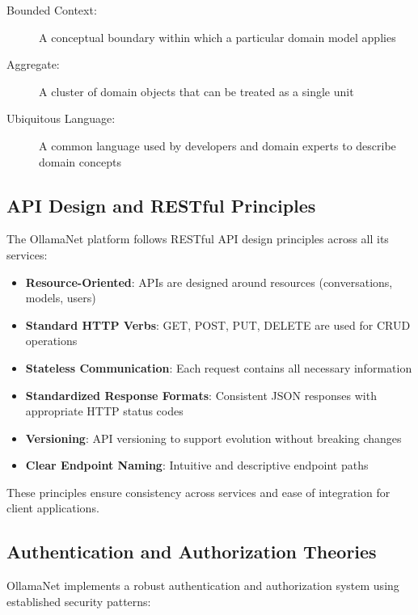 \begin{terminology}
\begin{description}
    \item[Bounded Context:] A conceptual boundary within which a particular domain model applies
    \item[Aggregate:] A cluster of domain objects that can be treated as a single unit
    \item[Ubiquitous Language:] A common language used by developers and domain experts to describe domain concepts
\end{description}
\end{terminology}

\subsection{API Design and RESTful Principles}

The OllamaNet platform follows RESTful API design principles across all its services:

\begin{itemize}
    \item \textbf{Resource-Oriented}: APIs are designed around resources (conversations, models, users)
    \item \textbf{Standard HTTP Verbs}: GET, POST, PUT, DELETE are used for CRUD operations
    \item \textbf{Stateless Communication}: Each request contains all necessary information
    \item \textbf{Standardized Response Formats}: Consistent JSON responses with appropriate HTTP status codes
    \item \textbf{Versioning}: API versioning to support evolution without breaking changes
    \item \textbf{Clear Endpoint Naming}: Intuitive and descriptive endpoint paths
\end{itemize}

These principles ensure consistency across services and ease of integration for client applications.

\subsection{Authentication and Authorization Theories}

OllamaNet implements a robust authentication and authorization system using established security patterns:

